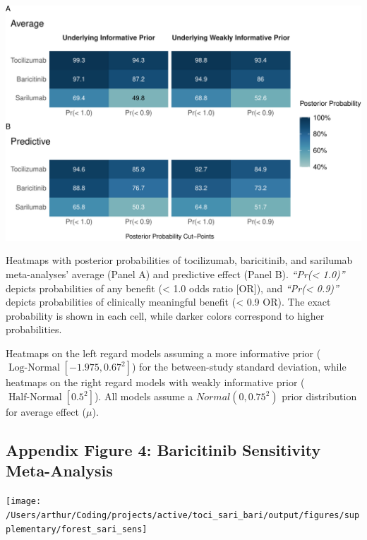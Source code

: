 \documentclass[
  12pt,
]{article}
\begin{document}
\begin{center}\includegraphics{supplementary_material_files/figure-latex/posterior probabilities heatmap-1} \end{center}

Heatmaps with posterior probabilities of tocilizumab, baricitinib, and
sarilumab meta-analyses' average (Panel A) and predictive effect (Panel
B). \emph{``Pr(\textless{} 1.0)''} depicts probabilities of any benefit
(\textless{} 1.0 odds ratio {[}OR{]}), and \emph{``Pr(\textless{}
0.9)''} depicts probabilities of clinically meaningful benefit
(\textless{} 0.9 OR). The exact probability is shown in each cell, while
darker colors correspond to higher probabilities.

Heatmaps on the left regard models assuming a more informative prior
(\(\operatorname{Log-Normal}[-1.975, 0.67^2]\)) for the between-study
standard deviation, while heatmaps on the right regard models with
weakly informative prior (\(\operatorname{Half-Normal}[0.5^2]\)). All
models assume a \(Normal(0, 0.75^2)\) prior distribution for average
effect (\(\mu\)).

\newpage

\hypertarget{appendix-figure-4-baricitinib-sensitivity-meta-analysis}{%
\subsection{Appendix Figure 4: Baricitinib Sensitivity
Meta-Analysis}\label{appendix-figure-4-baricitinib-sensitivity-meta-analysis}}

\begin{center}\texttt{[image: /Users/arthur/Coding/projects/active/toci\_sari\_bari/output/figures/supplementary/forest\_sari\_sens]} \end{center}
\end{document}
